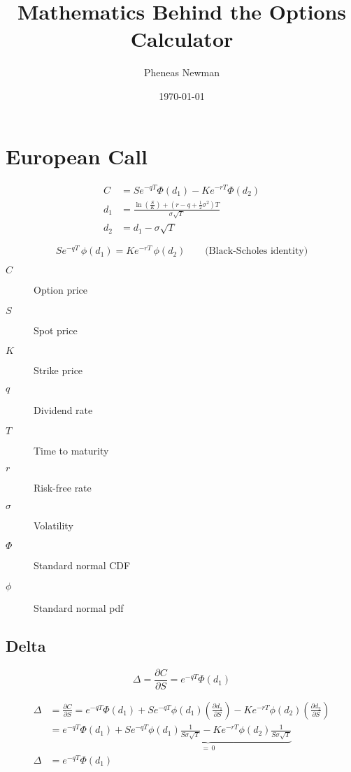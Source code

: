 \documentclass[12pt,a4paper]{article}
\begin{document}
\title{Mathematics Behind the Options Calculator}
\author{Pheneas Newman}
\date{\today}
\maketitle

\section{European Call}

\[
  \begin{aligned}
    C   & = S e^{-qT} \Phi(d_1) - K e^{-rT} \Phi(d_2) \\ 
    d_1 & = \frac{\ln\!\left(\tfrac{S}{K}\right) + (r - q + \tfrac{1}{2}\sigma^2)T}{\sigma \sqrt{T}} \\
    d_2 & = d_1 - \sigma \sqrt{T}
  \end{aligned}
\]

\[
  \boxed{S e^{-qT}\,\phi(d_1) = K e^{-rT}\,\phi(d_2)}
  \qquad\text{(Black-Scholes identity)}
\]

\begin{description}
  \item[$C$] Option price
  \item[$S$] Spot price
  \item[$K$] Strike price
  \item[$q$] Dividend rate
  \item[$T$] Time to maturity
  \item[$r$] Risk-free rate
  \item[$\sigma$] Volatility
  \item[$\Phi$] Standard normal CDF
  \item[$\phi$] Standard normal pdf
\end{description}

\subsection{Delta}
\[
  \boxed{\Delta = \frac{\partial C}{\partial S} = e^{-qT}\Phi(d_1)}
\]

\[
  \begin{aligned}
    \Delta & = \frac{\partial C}{\partial S} = e^{-qT}\Phi(d_1) + Se^{-q T}\phi(d_1)\left(\frac{\partial d_1}{\partial S}\right) - Ke^{-rT}\phi(d_2)\left(\frac{\partial d_2}{\partial S} \right) \\
           & = e^{-qT}\Phi(d_1) + \underbrace{Se^{-qT}\phi(d_1)\frac{1}{S \sigma \sqrt{T}} - Ke^{-rT}\phi(d_2)\frac{1}{S \sigma \sqrt{T}}}_{=\,0} \\
    \Delta & = e^{-qT}\Phi(d_1)
  \end{aligned}
\]
\end{document}
